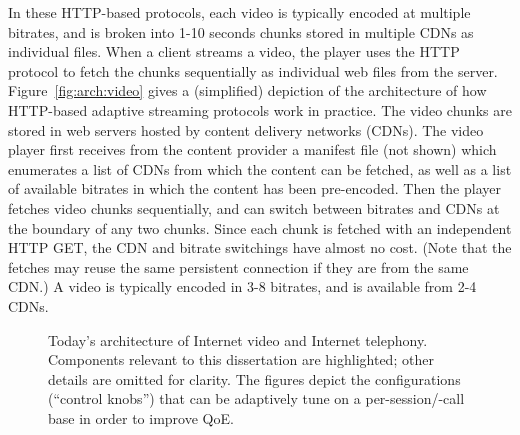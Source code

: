 In these HTTP-based protocols, each video is typically encoded at multiple 
bitrates, and is broken into 1-10 seconds chunks stored in multiple CDNs as individual files.
When a client streams a video, the player uses the HTTP protocol to fetch the chunks 
sequentially as individual web files from the server. 
Figure~\ref{fig:arch:video} gives a (simplified) depiction of the architecture
of how HTTP-based adaptive streaming protocols work in practice. 
The video chunks are stored in web servers hosted by content delivery networks
(CDNs). The video player first receives from the content provider a manifest file 
(not shown) which enumerates a list of CDNs from which the content can be 
fetched, as well as a list of available bitrates in which the content has been pre-encoded.
Then the player fetches video chunks sequentially, and 
can switch between bitrates and CDNs at the boundary of 
any two chunks. Since each chunk is fetched with an independent HTTP GET, 
the CDN and bitrate switchings have almost no cost.
(Note that the fetches may reuse the same persistent connection 
if they are from the same CDN.)
A video is typically encoded in 3-8 bitrates, and is available from 
2-4 CDNs.


\begin{figure}[t]
\centering
\captionsetup[subfigure]{justification=centering,farskip=-1pt,captionskip=5pt}
\caption{Today's architecture of Internet video and Internet telephony. 
Components relevant to this dissertation are highlighted; other details 
are omitted for clarity. 
The figures depict the configurations (``control knobs'')
that can be adaptively tune on a per-session/-call base in order to improve
QoE.}
\label{fig:app-arch}
\end{figure}



